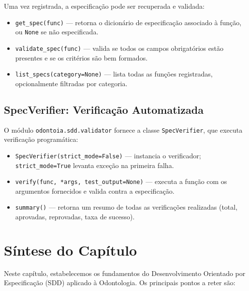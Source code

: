 Uma vez registrada, a especificação pode ser recuperada e validada:

\begin{itemize}
  \item \texttt{get\_spec(func)} — retorna o dicionário de especificação
    associado à função, ou \texttt{None} se não especificada.
  \item \texttt{validate\_spec(func)} — valida se todos os campos
    obrigatórios estão presentes e se os critérios são bem formados.
  \item \texttt{list\_specs(category=None)} — lista todas as funções
    registradas, opcionalmente filtradas por categoria.
\end{itemize}

\subsection{SpecVerifier: Verificação Automatizada}

O módulo \texttt{odontoia.sdd.validator} fornece a classe
\texttt{SpecVerifier}, que executa verificação programática:

\begin{itemize}
  \item \texttt{SpecVerifier(strict\_mode=False)} — instancia o
    verificador; \texttt{strict\_mode=True} levanta exceção na
    primeira falha.
  \item \texttt{verify(func, *args, test\_output=None)} — executa a
    função com os argumentos fornecidos e valida contra a especificação.
  \item \texttt{summary()} — retorna um resumo de todas as verificações
    realizadas (total, aprovadas, reprovadas, taxa de sucesso).
\end{itemize}



\section{Síntese do Capítulo}

Neste capítulo, estabelecemos os fundamentos do Desenvolvimento Orientado
por Especificação (SDD) aplicado à Odontologia. Os principais pontos
a reter são:

